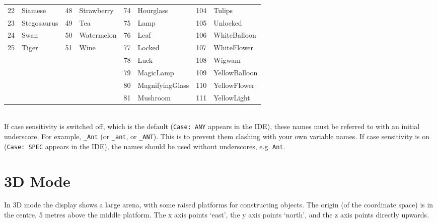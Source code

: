 \documentclass[12pt,a4paper,twoside]{article}
\renewcommand{\_}{\texttt{\symbol{95}}}
\begin{document}
\begin{tabular}{|ll|ll|ll|ll|}
 22 & Siamese     & 48 & Strawberry & 74 & Hourglass       & 104 & Tulips\\
 23 & Stegosaurus & 49 & Tea        & 75 & Lamp            & 105 & Unlocked\\
 24 & Swan        & 50 & Watermelon & 76 & Leaf            & 106 & WhiteBalloon\\
 25 & Tiger       & 51 & Wine       & 77 & Locked          & 107 & WhiteFlower\\
    &             &    &            & 78 & Luck            & 108 & Wigwam\\
    &             &    &            & 79 & MagicLamp       & 109 & YellowBalloon\\
    &             &    &            & 80 & MagnifyingGlass & 110 & YellowFlower\\
    &             &    &            & 81 & Mushroom        & 111 & YellowLight\\
\hline
\end{tabular}
\\[5mm]
If case sensitivity is switched off, which is the
default (\verb^Case: ANY^ appears in the IDE), these names must be referred
to with an initial underscore. For example, \verb^_Ant^ (or \verb^_ant^,
or \verb^_ANT^).
This is to prevent them clashing with your own variable names.
If case sensitivity is on (\verb^Case: SPEC^ appears in the IDE), the names
should be used without underscores, e.g. \verb^Ant^.


\newpage
\section{3D Mode} \label{sec:3d-mode}

In 3D mode the display shows a large arena, with some raised platforms
for constructing objects.
The origin (of the coordinate space) is in the centre, 5 metres above the middle platform.
The x axis points `east', the y axis points `north', and the z axis
points directly upwards.

%
%
\end{document}
